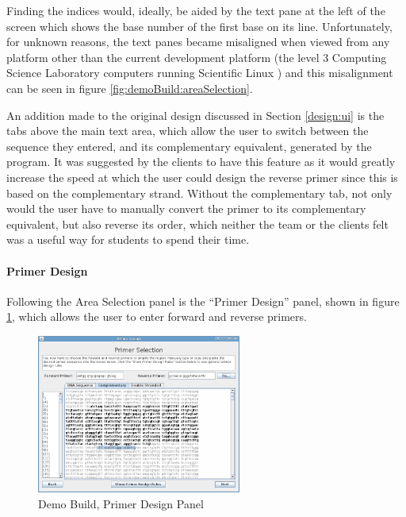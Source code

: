 Finding the indices would, ideally, be aided by the text pane at the 
left of the screen which shows the base number of the first base on its 
line. Unfortunately, for unknown reasons, the text panes became 
misaligned when viewed from any platform other than the current 
development platform (the level 3 Computing Science Laboratory computers
running Scientific Linux \cite{scientificLinux}) and this misalignment
can be seen in figure \ref{fig:demoBuild:areaSelection}.

An addition made to the original design discussed in Section
\ref{design:ui} is the tabs above the main text area, which allow the
user to switch between the sequence they entered, and its
complementary equivalent, generated by the program.
It was suggested by the clients to have this feature as it would
greatly increase the speed at which the user could design the reverse
primer since this is based on the complementary strand.
Without the complementary tab, not only would the user have to
manually convert the primer to its complementary equivalent, but also
reverse its order, which neither the team or the clients felt was a
useful way for students to spend their time. 


\paragraph{Primer Design}

Following the Area Selection panel is the ``Primer Design'' panel,
shown in figure \ref{fig:demoBuild:primerDesign}, which allows the
user to enter forward and reverse primers.

\begin{figure}[!t]
  \begin{center}
    \includegraphics[width=0.6\textwidth]{./images/demoBuild/primerDesign.png}
    \caption{
      \label{fig:demoBuild:primerDesign}
      Demo Build, Primer Design Panel
    }
  \end{center}
\end{figure}

